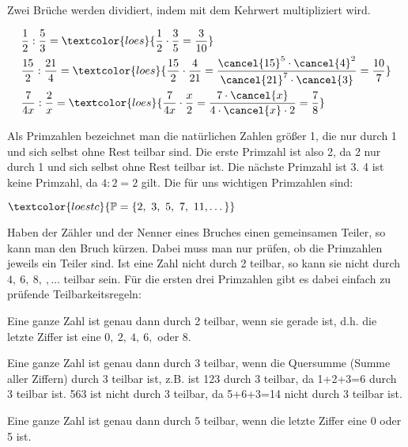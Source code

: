\begin{tcolorbox}
	Zwei Brüche werden dividiert, indem mit dem Kehrwert multipliziert wird.
\end{tcolorbox}
\begin{bsp}
	\begin{align*}
		&\frac{1}{2}:\frac{5}{3}=\textcolor{loes}{\frac{1}{2}\cdot\frac{3}{5}=\frac{3}{10}}\\
		&\frac{15}{2}:\frac{21}{4}=\textcolor{loes}{\frac{15}{2}\cdot\frac{4}{21}=\frac{\cancel{15}^5\cdot\cancel{4}^2}{\cancel{21}^7\cdot \cancel{3}}=\frac{10}{7}}\\
		&\frac{7}{4x}:\frac{2}{x}=\textcolor{loes}{\frac{7}{4x}\cdot\frac{x}{2}=\frac{7\cdot\cancel{x}}{4\cdot\cancel{x}\cdot 2}=\frac{7}{8}}
	\end{align*}
\end{bsp}
\newpage
Als Primzahlen bezeichnet man die natürlichen Zahlen größer 1, die nur durch 1 und sich selbst ohne Rest teilbar sind. Die erste Primzahl ist also 2, da 2 nur durch 1 und sich selbst ohne Rest teilbar ist. Die nächste Primzahl ist 3. 4 ist keine Primzahl, da \(4:2=2\) gilt. Die für uns wichtigen Primzahlen sind:
\begin{tcolorbox}\centering
	\(\textcolor{loestc}{\mathbb{P}=\{2,\ 3,\ 5,\ 7,\ 11,\dots\}}\)
\end{tcolorbox}
Haben der Zähler und der Nenner eines Bruches einen gemeinsamen Teiler, so kann man den Bruch kürzen. Dabei muss man nur prüfen, ob die Primzahlen jeweils ein Teiler sind. Ist eine Zahl nicht durch 2 teilbar, so kann sie nicht durch \(4,\ 6,\ 8,\ ,\dots\) teilbar sein. Für die ersten drei Primzahlen gibt es dabei einfach zu prüfende Teilbarkeitsregeln:
\begin{tcolorbox}\centering
	\textcolor{loestc}{Eine ganze Zahl ist genau dann durch 2 teilbar, wenn sie gerade ist, d.h. die letzte Ziffer ist eine \(0,\ 2,\ 4,\ 6,\) oder  \(8\).}
\end{tcolorbox}
\begin{tcolorbox}\centering
	\textcolor{loestc}{Eine ganze Zahl ist genau dann durch 3 teilbar, wenn die Quersumme (Summe aller Ziffern) durch 3 teilbar ist, z.B. ist 123 durch 3 teilbar, da 1+2+3=6 durch 3 teilbar ist. 563 ist nicht durch 3 teilbar, da 5+6+3=14 nicht durch 3 teilbar ist.}
\end{tcolorbox}
\begin{tcolorbox}\centering
	\textcolor{loestc}{Eine ganze Zahl ist genau dann durch 5 teilbar, wenn die letzte Ziffer eine 0 oder 5 ist.}
\end{tcolorbox}
